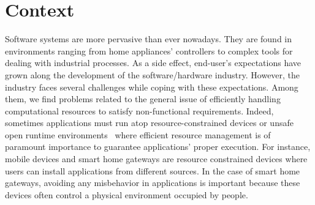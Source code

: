 \section{Context}

Software systems are more pervasive than ever nowadays.
They are found in environments ranging from home appliances' controllers to complex tools for dealing with industrial processes.
As a side effect, end-user's expectations have grown along the development of the software/hardware industry.
However, the industry faces several challenges while coping with these expectations.
Among them, we find problems related to the general issue of efficiently handling computational resources to satisfy non-functional requirements.
Indeed, sometimes applications must run atop resource-constrained devices or unsafe open runtime environments~\cite{baresi2006toward} where efficient resource management is of paramount importance to guarantee applications' proper execution.
For instance, mobile devices and smart home gateways are resource constrained devices where users can install applications from different sources.
In the case of smart home gateways, avoiding any misbehavior in applications is important because these devices often control a physical environment occupied by people.

